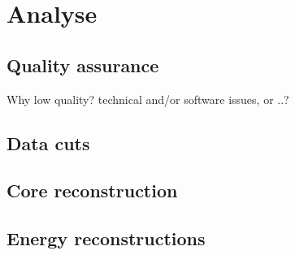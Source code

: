 \chapter{Analyse}
\label{ch:analyse}


\section{Quality assurance}


Why low quality? technical and/or software issues, or ..?


\section{Data cuts}


\section{Core reconstruction}



\section{Energy reconstructions}

